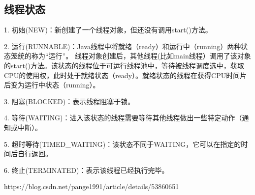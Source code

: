 \documentclass[../../../interview-questions.tex]{subfiles}
\begin{document}
\subsection{线程状态}

1. 初始(NEW)：新创建了一个线程对象，但还没有调用start()方法。

2. 运行(RUNNABLE)：Java线程中将就绪（ready）和运行中（running）两种状态笼统的称为“运行”。
线程对象创建后，其他线程(比如main线程）调用了该对象的start()方法。该状态的线程位于可运行线程池中，等待被线程调度选中，获取CPU的使用权，此时处于就绪状态（ready）。就绪状态的线程在获得CPU时间片后变为运行中状态（running）。

3. 阻塞(BLOCKED)：表示线程阻塞于锁。

4. 等待(WAITING)：进入该状态的线程需要等待其他线程做出一些特定动作（通知或中断）。

5. 超时等待(TIMED\_WAITING)：该状态不同于WAITING，它可以在指定的时间后自行返回。

6. 终止(TERMINATED)：表示该线程已经执行完毕。

https://blog.csdn.net/pange1991/article/details/53860651
\end{document}
